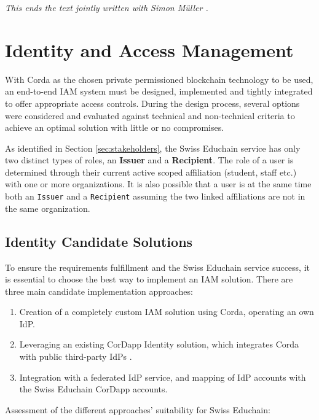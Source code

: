 \emph{This ends the text jointly written with Simon M{\"u}ller \cite{mueller20}.}

\section{Identity and Access Management} \label{sec:iam-design}

With Corda as the chosen private permissioned blockchain technology to be used, an end-to-end IAM system must be designed, implemented and tightly integrated to offer appropriate access controls. During the design process, several options were considered and evaluated against technical and non-technical criteria to achieve an optimal solution with little or no compromises.

As identified in Section \ref{sec:stakeholders}, the Swiss Educhain service has only two distinct types of roles, an \textbf{Issuer} and a \textbf{Recipient}. The role of a user is determined through their current active scoped affiliation (student, staff etc.) with one or more organizations. It is also possible that a user is at the same time both an \texttt{Issuer} and a \texttt{Recipient} assuming the two linked affiliations are not in the same organization.

\subsection{Identity Candidate Solutions} \label{ssec:iam-candidate-solutions}

To ensure the requirements fulfillment and the Swiss Educhain service success, it is essential to choose the best way to implement an IAM solution. There are three main candidate implementation approaches:

\begin{enumerate}
	\itemsep0em
	\item Creation of a completely custom IAM solution using Corda, operating an own IdP.
	\item Leveraging an existing CorDapp Identity solution, which integrates Corda with public third-party IdPs \cite{r3-market-identity}.
	\item Integration with a federated IdP service, and mapping of IdP accounts with the Swiss Educhain CorDapp accounts.
\end{enumerate}

Assessment of the different approaches' suitability for Swiss Educhain:

